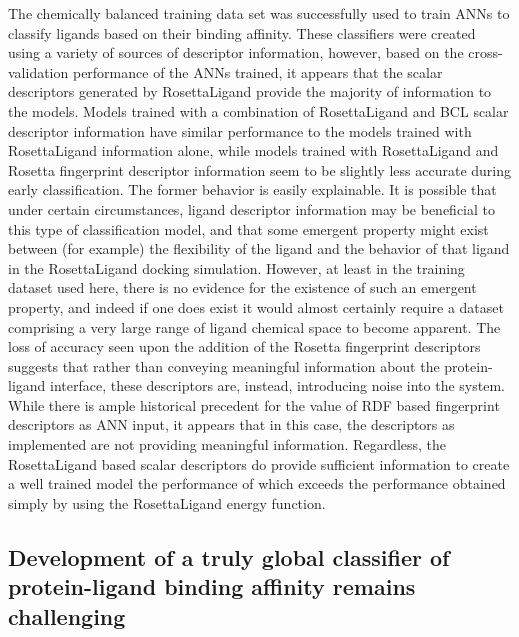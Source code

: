 The chemically balanced training data set was successfully used to train ANNs to classify ligands based on their binding affinity.
These classifiers were created using a variety of sources of descriptor information, however, based on the cross-validation performance of the ANNs trained, it appears that the scalar descriptors generated by RosettaLigand provide the majority of information to the models.
Models trained with a combination of RosettaLigand and BCL scalar descriptor information have similar performance to the models trained with RosettaLigand information alone, while models trained with RosettaLigand and Rosetta fingerprint descriptor information seem to be slightly less accurate during early classification.
The former behavior is easily explainable.
It is possible that under certain circumstances, ligand descriptor information may be beneficial to this type of classification model, and that some emergent property might exist between (for example) the flexibility of the ligand and the behavior of that ligand in the RosettaLigand docking simulation.
However, at least in the training dataset used here, there is no evidence for the existence of such an emergent property, and indeed if one does exist it would almost certainly require a dataset comprising a very large range of ligand chemical space to become apparent. 
The loss of accuracy seen upon the addition of the Rosetta fingerprint descriptors suggests that rather than conveying meaningful information about the protein-ligand interface, these descriptors are, instead, introducing noise into the system.
While there is ample historical precedent\citep{Mueller:2010dx,Butkiewicz:2013ka,Hristozov:2007bz} for the value of RDF based fingerprint descriptors as ANN input, it appears that in this case, the descriptors as implemented are not providing meaningful information.
Regardless, the RosettaLigand based scalar descriptors do provide sufficient information to create a well trained model the performance of which exceeds the performance obtained simply by using the RosettaLigand energy function. 

\subsection{Development of a truly global classifier of protein-ligand binding affinity remains challenging}

